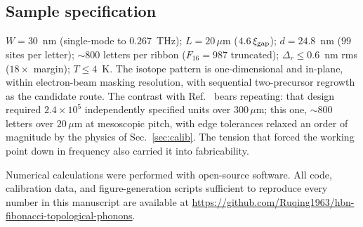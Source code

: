 \documentclass[aps,prl,preprint,superscriptaddress,longbibliography]{revtex4-2}
\begin{document}
\subsection{Sample specification}

$W = 30$~nm (single-mode to $0.267$~THz); $L = 20\,\mu$m
($4.6\,\xi_{\rm gap}$); $d = 24.8$~nm ($99$ sites per letter);
$\sim$800 letters per ribbon ($F_{16} = 987$ truncated);
$\Delta_r \le 0.6$~nm rms ($18\times$ margin); $T \le 4$~K. The isotope
pattern is one-dimensional and in-plane, within electron-beam masking
resolution, with sequential two-precursor regrowth as the candidate route.
The contrast with Ref.~\cite{paper1} bears repeating: that design required
$2.4\times10^5$ independently specified units over $300\,\mu$m; this one,
$\sim$800 letters over $20\,\mu$m at mesoscopic pitch, with edge tolerances
relaxed an order of magnitude by the physics of Sec.~\ref{sec:calib}. The
tension that forced the working point down in frequency also carried it into
fabricability.

\begin{acknowledgments}
Numerical calculations were performed with open-source software. All code,
calibration data, and figure-generation scripts sufficient to reproduce every
number in this manuscript are available at
\url{https://github.com/Ruqing1963/hbn-fibonacci-topological-phonons}.
\end{acknowledgments}


\end{document}
